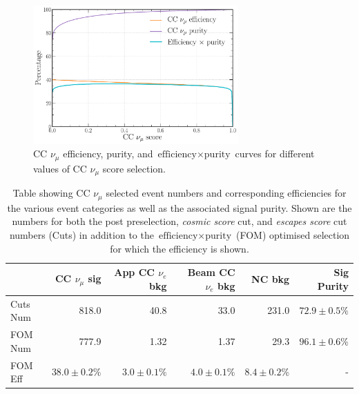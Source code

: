 \begin{figure} %
    \includegraphics[width=0.7\textwidth]{diagrams/7-results/final_numu_eff_curves.pdf}
    \caption[CC $\nu_{\mu}$ efficiency, purity, and $\text{efficiency}\times\text{purity}$ curves]
    {CC $\nu_{\mu}$ efficiency, purity, and $\text{efficiency}\times\text{purity}$ curves for
        different values of CC $\nu_{\mu}$ score selection.}
    \label{fig:final_numu_eff_curves}
\end{figure}

\begin{table}
    \begin{tabular}{lrrrrr}
                 & CC $\nu_{\mu}$ sig & App CC $\nu_{e}$ bkg & Beam CC $\nu_{e}$ bkg & NC bkg &
                 Sig Purity     \\
        \midrule
        Cuts Num & 818.0              & 40.8                 & 33.0                  & 231.0 &
        $72.9\pm0.5\%$ \\
        FOM Num  & 777.9              & 1.32                 & 1.37                  & 29.3 &
        $96.1\pm0.6\%$ \\
        \midrule
        FOM Eff  & $38.0\pm0.2\%$     & $3.0\pm0.1\%$        & $4.0\pm0.1\%$         &
        $8.4\pm0.2\%$ & -              \\
    \end{tabular}
    \caption[Table showing CC $\nu_{\mu}$ selected event numbers, efficiencies and signal purity]
    {Table showing CC $\nu_{\mu}$ selected event numbers and corresponding efficiencies for the
        various event categories as well as the associated signal purity. Shown are the numbers
        for both the post preselection, \emph{cosmic score} cut, and \emph{escapes score} cut
        numbers (Cuts) in addition to the $\text{efficiency}\times\text{purity}$ (FOM) optimised
        selection for which the efficiency is shown.}
    \label{tab:numu_selection}
\end{table}

